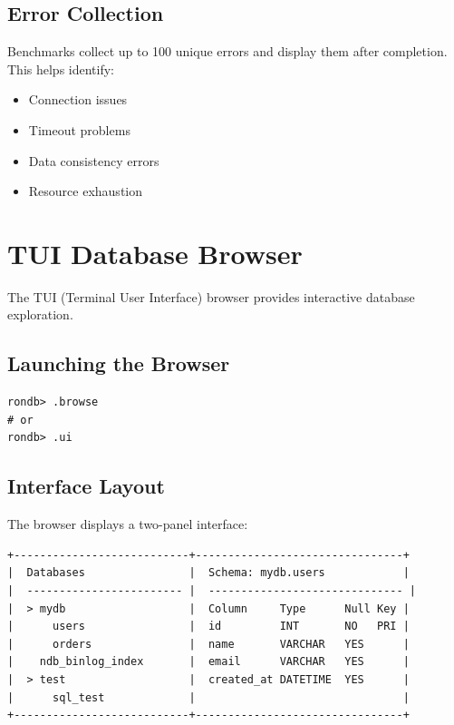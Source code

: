 \documentclass[11pt,a4paper]{report}
\begin{document}
\section{Error Collection}

Benchmarks collect up to 100 unique errors and display them after completion. This helps identify:
\begin{itemize}
    \item Connection issues
    \item Timeout problems
    \item Data consistency errors
    \item Resource exhaustion
\end{itemize}

\chapter{TUI Database Browser}

The TUI (Terminal User Interface) browser provides interactive database exploration.

\section{Launching the Browser}

\begin{lstlisting}[language=rondb]
rondb> .browse
# or
rondb> .ui
\end{lstlisting}

\section{Interface Layout}

The browser displays a two-panel interface:

\begin{verbatim}
+---------------------------+--------------------------------+
|  Databases                |  Schema: mydb.users            |
|  ------------------------ |  ------------------------------ |
|  > mydb                   |  Column     Type      Null Key |
|      users                |  id         INT       NO   PRI |
|      orders               |  name       VARCHAR   YES      |
|    ndb_binlog_index       |  email      VARCHAR   YES      |
|  > test                   |  created_at DATETIME  YES      |
|      sql_test             |                                |
+---------------------------+--------------------------------+
\end{verbatim}
\end{document}
